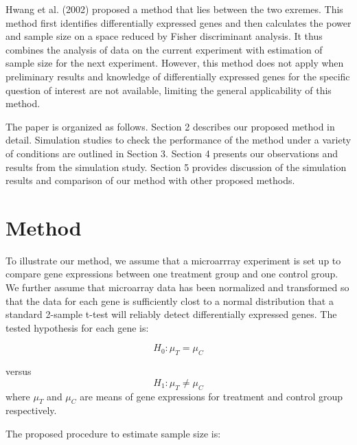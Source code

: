 \documentclass{bioinfo}
\begin{document}
Hwang et al.  (2002) proposed a method that lies between the two
exremes.  This method first identifies differentially expressed genes
and then calculates the power and sample size on a space reduced by
Fisher discriminant analysis. It thus combines the analysis of data on
the current experiment with estimation of sample size for the next
experiment. However, this method does not apply when preliminary
results and knowledge of differentially expressed genes for the
specific question of interest are not available, limiting the general
applicability of this method.

The paper is organized as follows. Section 2 describes our proposed
method in detail. Simulation studies to check the performance of the
method under a variety of conditions are outlined in Section 3.
Section 4 presents our observations and results from the simulation
study.  Section 5 provides discussion of the simulation results and
comparison of our method with other proposed methods.

\section{Method}
To illustrate our method, we assume that a microarrray experiment is set
up to compare gene expressions between one treatment group and one
control group. We further assume that microarray data has been
normalized and transformed so that the data for each gene is
sufficiently clost to a normal distribution that a standard 2-sample
t-test will reliably detect differentially expressed genes. The tested
hypothesis for each gene is:

\begin{equation}
  H_0: \mu_{T} = \mu_{C}  \nonumber
\end{equation}

versus
\begin{equation}
  H_1: \mu_{T} \neq \mu_{C} \nonumber
\end{equation}
where $\mu_{T}$ and $\mu_{C}$ are means of gene expressions for treatment and control group respectively.

The proposed procedure to estimate sample size is:
\end{document}

